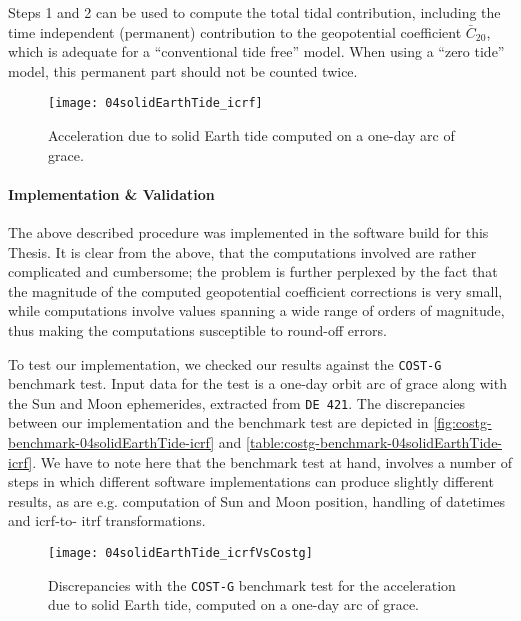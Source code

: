 Steps 1 and 2 can be used to compute the total tidal contribution, including 
the time independent (permanent) contribution to the geopotential coefficient 
$\bar{C}_{20}$, which is adequate for a ``conventional tide free'' model. 
When using a ``zero tide'' model, this permanent part should not be counted 
twice.

\begin{figure}
  \centering
  \texttt{[image: 04solidEarthTide\_icrf]}
  \caption{Acceleration due to solid Earth tide computed on a one-day arc of \gls{grace}.}
  \label{fig:04solidEarthTide-icrf}
\end{figure}

\paragraph{Implementation \& Validation}\label{par:solid-earth-acceleration-implementation}
The above described procedure was implemented in the software build for this Thesis. 
It is clear from the above, that the computations involved are rather complicated and 
cumbersome; the problem is further perplexed by the fact that the magnitude of the 
computed geopotential coefficient corrections is very small, while computations 
involve values spanning a wide range of orders of magnitude, thus making the computations 
susceptible to round-off errors.

To test our implementation, we checked our results against the \texttt{COST-G} 
benchmark test. Input data for the test is a one-day orbit arc of \gls{grace} 
along with the Sun and Moon ephemerides, extracted from \texttt{DE 421}. 
The discrepancies between our implementation and the benchmark test are depicted in 
\autoref{fig:costg-benchmark-04solidEarthTide-icrf} and \autoref{table:costg-benchmark-04solidEarthTide-icrf}. 
We have to note here that the benchmark test at hand, involves a number of steps in 
which different software implementations can produce slightly different results, 
as are e.g. computation of Sun and Moon position, handling of datetimes and \gls{icrf}-to-
\gls{itrf} transformations.

\begin{figure}
  \centering
  \texttt{[image: 04solidEarthTide\_icrfVsCostg]}
  \caption{Discrepancies with the \texttt{COST-G} benchmark test for the acceleration 
    due to solid Earth tide, computed on a one-day arc of \gls{grace}.}
  \label{fig:costg-benchmark-04solidEarthTide-icrf}
\end{figure}

